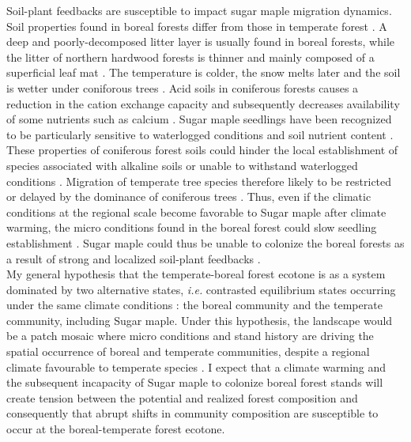 Soil-plant feedbacks are susceptible to impact sugar maple migration dynamics.
Soil properties found in boreal forests differ from those in temperate forest
\cite{Lafleur2010,Barras1998,Goldblum2010,Demers1998}. A deep and poorly-decomposed  
litter layer is usually found in boreal forests, while the litter
of  northern hardwood forests is thinner and mainly composed of a superficial
leaf mat \cite{Barras1998}. The temperature is colder, the snow melts later
and the soil is wetter under coniforous trees \cite{Lafleur2010,Goldblum2010}.
Acid soils in coniferous forests causes a reduction in the cation exchange
capacity and subsequently decreases availability of some nutrients such as
calcium \cite{Moore2008}. Sugar maple seedlings have been recognized to be
particularly sensitive to waterlogged conditions and soil nutrient content
\cite{Moore2008,Lafleur2010,Cleavitt2011}. These properties of coniferous
forest soils could hinder the local establishment of species associated with
alkaline soils or unable to withstand waterlogged conditions
\cite{Lafleur2010}. Migration of temperate tree species therefore likely to be
restricted or delayed by the dominance of coniferous trees \cite{Lafleur2010}.
Thus, even if the climatic conditions at the regional scale become favorable
to Sugar maple after climate warming, the micro conditions found in the boreal
forest could slow seedling establishment
\cite{Kellman2004,Moore2008,Barras1998,Messier2011}. Sugar maple could thus be
unable to colonize the boreal forests as a result of strong and localized
soil-plant feedbacks \cite{McCarthyNeumann2012}.\\

My general hypothesis that the temperate-boreal forest ecotone is as a system
dominated by two alternative states, \textit{i.e.} contrasted equilibrium
states occurring under the same climate conditions \cite{scheffer2009critical}:
the boreal community and the temperate community, including Sugar maple. Under
this hypothesis, the landscape would be a patch mosaic where micro conditions
and stand history are driving the spatial occurrence of boreal and temperate
communities, despite a regional climate favourable to temperate species
\cite{Goldblum2010,Fisichelli2013}. I expect that a climate warming and the
subsequent incapacity of Sugar maple to colonize boreal forest stands will
create  tension between the potential and realized forest composition and
consequently that abrupt shifts in community composition are susceptible to
occur at the boreal-temperate forest ecotone.\\

